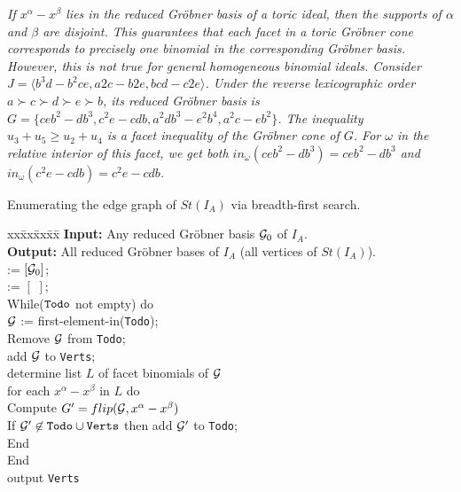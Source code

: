 \documentclass[11pt]{article}
\begin{document}
\begin{remark}{\em 
If $x^{\alpha} - x^{\beta}$ lies in the reduced Gr\"obner basis of a
toric ideal, then the supports of $\alpha$ and $\beta$ are disjoint.
This guarantees that each facet in a toric Gr\"obner cone corresponds
to precisely one binomial in the corresponding Gr\"obner basis. 
However, this is not true for general homogeneous
binomial ideals. Consider $J = \langle
b^3d-b^2ce, a2c-b2e, bcd-c2e \rangle$. Under the reverse lexicographic
order $a \succ c \succ d \succ e \succ b$, its reduced Gr\"obner basis is 
$G = \{ ceb^2-db^3, c^2e-cdb, a^2db^3-e^2b^4, a^2c-eb^2 \}$. The 
inequality $u_3 + u_5 \geq u_2 + u_4$ is a facet inequality of the 
Gr\"obner cone of $G$. For $\omega$ in the relative interior of this facet,
we get both $in_{\omega}(ceb^2-db^3) = ceb^2-db^3$ and 
$in_{\omega}(c^2e-cdb) = c^2e-cdb$.}
\end{remark}

\begin{algorithm}
 Enumerating the edge graph of $St(I_A)$ via breadth-first search.
\begin{tabbing}
 xx\=xx\=xx\=xx\=\kill  
   {\bf Input:} Any reduced Gr\"obner basis ${\cal G}_0$ of $I_A$.\\
   {\bf Output:} All reduced Gr\"obner bases of $I_A$ (all vertices of
                 $St(I_A)$).\\ 
   := $\left[{\cal G}_0\right]$; \\
   := $\left[ \,\, \right]$;\\
   \> While(${\tt Todo}$ not empty) do\\
   \> \> ${\cal G}$ := first-element-in({\tt Todo});\\
   \> \> Remove ${\cal G}$ from {\tt Todo};\\
   \> \> add ${\cal G}$ to {\tt Verts};\\
   \> \> determine list $L$ of facet binomials of ${\cal G}$\\
   \> \> for each $x^{\alpha} - x^{\beta}$ in $L$ do\\
   \> \> \> Compute $G'=flip({\cal G},x^{\alpha}-x^{\beta})$\\
   \>\>\> If ${\cal G}'\not\in {\tt Todo}\cup{\tt Verts}$ then
          add ${\cal G}'$ to {\tt Todo};\\  
   \>\>End \\
   \>End\\
   \> output {\tt Verts}
\end{tabbing} 
\end{algorithm}
\end{document}

